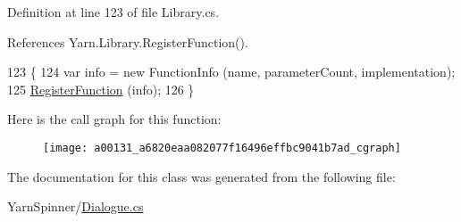 Definition at line 123 of file Library.\-cs.



References Yarn.\-Library.\-Register\-Function().


\begin{DoxyCode}
123                                                                                                \{
124             var info = \textcolor{keyword}{new} FunctionInfo (name, parameterCount, implementation);
125             \hyperlink{a00131_a001ab29d21fe7db10fc9c250914287f9}{RegisterFunction} (info);
126         \}
\end{DoxyCode}


Here is the call graph for this function\-:
\nopagebreak
\begin{figure}[H]
\begin{center}
\leavevmode
\texttt{[image: a00131\_a6820eaa082077f16496effbc9041b7ad\_cgraph]}
\end{center}
\end{figure}




The documentation for this class was generated from the following file\-:\begin{DoxyCompactItemize}
\item 
Yarn\-Spinner/\hyperlink{a00308}{Dialogue.\-cs}\end{DoxyCompactItemize}
